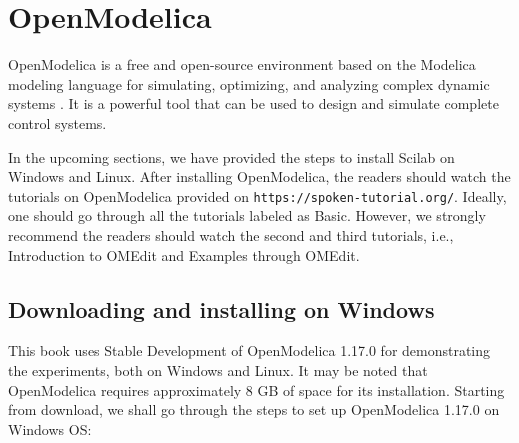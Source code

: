 \begin{juliacode}
      \label{julia:test-firmware}
      
\end{juliacode}






\section{OpenModelica}
\label{sec:OpenModelica-start}
OpenModelica is a free and open-source environment based on the Modelica modeling language 
for simulating, optimizing, and analyzing complex dynamic systems \cite{om-ref}.
It is a powerful tool that can be used to design and simulate complete control systems. 

In the upcoming sections, we have provided the steps to install Scilab on Windows and Linux. 
After installing OpenModelica, the readers should watch the tutorials on OpenModelica provided on 
{\tt https://spoken-tutorial.org/}. Ideally, one should go through all the tutorials labeled as Basic. 
However, we strongly recommend the readers should watch the second and third tutorials, i.e., 
Introduction to OMEdit and Examples through OMEdit.


\subsection{Downloading and installing on Windows} \label{openmodelica-install-windows}
This book uses Stable Development of OpenModelica 1.17.0 for demonstrating 
the experiments, both on Windows and Linux. It may be noted that 
OpenModelica requires approximately 8 GB of space for its installation. 
Starting from download, we shall go through the steps to set up OpenModelica 
1.17.0 on Windows OS:

